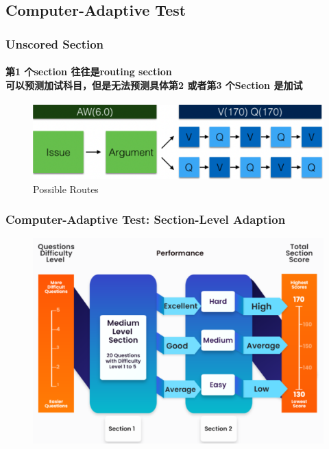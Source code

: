 \documentclass[
	11pt, %
]{beamer}
\begin{document}
\subsection{Computer-Adaptive Test}

\begin{frame}
	\frametitle{Unscored Section}
	\framesubtitle{第1 个section 往往是routing section\\ 可以预测加试科目，但是无法预测具体第2 或者第3 个Section 是加试}
	
	\begin{figure}
		\includegraphics[width=0.9\linewidth]{Unscored_section.png}
		\caption{Possible Routes}
	\end{figure}
\end{frame}


\begin{frame}
	\frametitle{Computer-Adaptive Test: Section-Level Adaption}
	
	\begin{figure}
		\includegraphics[width=0.9\linewidth]{GRE_Section_Adaptive.png}
	\end{figure}
\end{frame}

\end{document}
